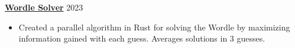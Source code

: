 \textbf{\href{https://github.com/lucamanolache/wordle}{Wordle Solver}} \hfill 2023 \par
\begin{itemize}
	\item Created a parallel algorithm in Rust for solving the Wordle by maximizing information gained with each guess. Averages solutions in 3 guesses.
\end{itemize} \par